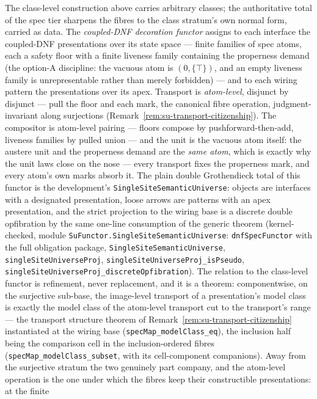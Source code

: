 The class-level construction above carries arbitrary classes; the
authoritative total of the spec tier sharpens the fibres to the
class stratum's own normal form, carried as data. The
\emph{coupled-DNF decoration functor} assigns to each interface the
coupled-DNF presentations over its state space --- finite families
of spec atoms, each a safety floor with a finite liveness family
containing the properness demand (the option-A discipline: the
vacuous atom is $(0, \{\top\})$, and an empty liveness family is
unrepresentable rather than merely forbidden) --- and to each wiring
pattern the presentations over its apex. Transport is
\emph{atom-level}, disjunct by disjunct --- pull the floor and each
mark, the canonical fibre operation, judgment-invariant along
surjections (Remark~\ref{rem:su-transport-citizenship}). The
compositor is atom-level pairing --- floors compose by
pushforward-then-add, liveness families by pulled union --- and the
unit is the vacuous atom itself: the austere unit and the properness
demand are the \emph{same atom}, which is exactly why the unit laws
close on the nose --- every transport fixes the properness mark, and
every atom's own marks absorb it. The plain double Grothendieck
total of this functor is the development's
\texttt{SingleSiteSemanticUniverse}: objects are interfaces with a designated
presentation, loose arrows are patterns with an apex presentation,
and the strict projection to the wiring base is a discrete double
opfibration by the same one-line consumption of the generic theorem
(kernel-checked, module \texttt{SuFunctor.SingleSiteSemanticUniverse}:
\texttt{dnfSpecFunctor} with the full obligation package,
\texttt{SingleSiteSemanticUniverse}, \texttt{singleSiteUniverseProj},
\texttt{singleSiteUniverseProj\_isPseudo},
\texttt{singleSiteUniverseProj\_discreteOpfibration}). The relation to
the class-level functor is refinement, never replacement, and it is
a theorem: componentwise, on the surjective sub-base, the
image-level transport of a presentation's model class is exactly the
model class of the atom-level transport cut to the transport's range
--- the transport structure theorem of
Remark~\ref{rem:su-transport-citizenship} instantiated at the wiring
base (\texttt{specMap\_modelClass\_eq}), the inclusion half being
the comparison cell in the inclusion-ordered fibres
(\texttt{specMap\_modelClass\_subset}, with its cell-component
companions). Away from the surjective stratum the two genuinely part
company, and the atom-level operation is the one under which the
fibres keep their constructible presentations: at the finite
